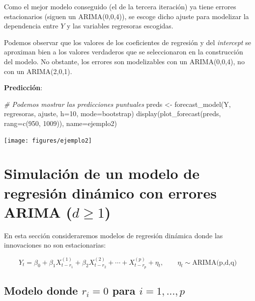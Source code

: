 \documentclass[
  12pt,
  a4paper]{article}
\newenvironment{Shaded}{\begin{snugshade}}{\end{snugshade}}
\newcommand{\AttributeTok}[1]{\textcolor[rgb]{0.77,0.63,0.00}{#1}}
\newcommand{\CommentTok}[1]{\textcolor[rgb]{0.56,0.35,0.01}{\textit{#1}}}
\newcommand{\DecValTok}[1]{\textcolor[rgb]{0.00,0.00,0.81}{#1}}
\newcommand{\FunctionTok}[1]{\textcolor[rgb]{0.00,0.00,0.00}{#1}}
\newcommand{\NormalTok}[1]{#1}
\newcommand{\OtherTok}[1]{\textcolor[rgb]{0.56,0.35,0.01}{#1}}
\newcommand{\StringTok}[1]{\textcolor[rgb]{0.31,0.60,0.02}{#1}}
\begin{document}
Como el mejor modelo conseguido (el de la tercera iteración) ya tiene
errores estacionarios (siguen un ARIMA(0,0,4)), se escoge dicho ajuste
para modelizar la dependencia entre \(Y\) y las variables regresoras
escogidas.

Podemos observar que los valores de los coeficientes de regresión y del
\emph{intercept} se aproximan bien a los valores verdaderos que se
seleccionaron en la construcción del modelo. No obstante, los errores
son modelizables con un ARIMA(0,0,4), no con un ARIMA(2,0,1).

\textbf{Predicción}:

\begin{Shaded}
\begin{Highlighting}[]
\CommentTok{\# Podemos mostrar las predicciones puntuales}
\NormalTok{preds }\OtherTok{\textless{}{-}} \FunctionTok{forecast\_model}\NormalTok{(Y, regresoras, ajuste, }\AttributeTok{h=}\DecValTok{10}\NormalTok{, }\AttributeTok{mode=}\StringTok{\textquotesingle{}bootstrap\textquotesingle{}}\NormalTok{)}
\FunctionTok{display}\NormalTok{(}\FunctionTok{plot\_forecast}\NormalTok{(preds, }\AttributeTok{rang=}\FunctionTok{c}\NormalTok{(}\DecValTok{950}\NormalTok{, }\DecValTok{1009}\NormalTok{)), }\AttributeTok{name=}\StringTok{\textquotesingle{}ejemplo2\textquotesingle{}}\NormalTok{)}
\end{Highlighting}
\end{Shaded}

\begin{center}\texttt{[image: figures/ejemplo2]} \end{center}

\hypertarget{simulaciuxf3n-de-un-modelo-de-regresiuxf3n-dinuxe1mico-con-errores-arima-dgeq-1}{%
\section{\texorpdfstring{Simulación de un modelo de regresión dinámico
con errores ARIMA
(\(d\geq 1\))}{Simulación de un modelo de regresión dinámico con errores ARIMA (d\textbackslash geq 1)}}\label{simulaciuxf3n-de-un-modelo-de-regresiuxf3n-dinuxe1mico-con-errores-arima-dgeq-1}}

En esta sección consideraremos modelos de regresión dinámica donde las
innovaciones no son estacionarias:

\[Y_t = \beta_0 + \beta_1 X_{t-r_1}^{(1)} + \beta_2 X_{t-r_2}^{(2)} + \cdots + X_{t-r_p}^{(p)}+ \eta_t, \qquad \eta_t\sim \text{ARIMA(p,d,q)} \]

\hypertarget{ejemplo3}{%
\subsection{\texorpdfstring{Modelo donde \(r_i=0\) para
\(i=1,...,p\)}{Modelo donde r\_i=0 para i=1,...,p}}\label{ejemplo3}}
\end{document}

